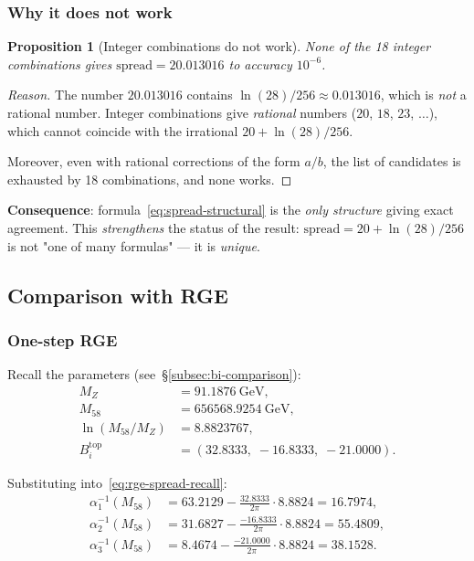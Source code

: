 \documentclass[11pt,a4paper]{article}
\newtheorem{proposition}[theorem]{Proposition}
\theoremstyle{definition}
\begin{document}
\subsubsection{Why it does not work}

\begin{proposition}[Integer combinations do not work]
\label{prop:integer-fails}
None of the 18 integer combinations gives
$\text{spread} = 20.013016$ to accuracy $10^{-6}$.
\end{proposition}

\begin{proof}[Reason]
The number $20.013016$ contains $\ln(28)/256 \approx 0.013016$,
which is \emph{not} a rational number. Integer
combinations give \emph{rational} numbers ($20$, $18$, $23$,
$\ldots$), which cannot coincide with the irrational
$20 + \ln(28)/256$.

Moreover, even with rational corrections of the form $a/b$,
the list of candidates is exhausted by 18 combinations, and none works.
\end{proof}

\medskip\noindent
\textbf{Consequence}: formula~\eqref{eq:spread-structural}
is the \emph{only structure} giving exact agreement.
This \emph{strengthens} the status of the result: $\text{spread} = 20 + \ln(28)/256$
is not "one of many formulas" --- it is \emph{unique}.

\subsection{Comparison with RGE}
\label{subsec:spread-rge}

\subsubsection{One-step RGE}

Recall the parameters (see~\S\ref{subsec:bi-comparison}):
\begin{align}
    M_Z &= 91.1876~\text{GeV}, \\
    M_{58} &= 656568.9254~\text{GeV}, \\
    \ln(M_{58}/M_Z) &= 8.8823767, \\
    B_i^{\text{top}} &= (32.8333,\; -16.8333,\; -21.0000).
\end{align}

\medskip\noindent
Substituting into~\eqref{eq:rge-spread-recall}:
\begin{align}
    \alpha_1^{-1}(M_{58}) &= 63.2129 - \frac{32.8333}{2\pi} \cdot 8.8824
    = 16.7974, \\
    \alpha_2^{-1}(M_{58}) &= 31.6827 - \frac{-16.8333}{2\pi} \cdot 8.8824
    = 55.4809, \\
    \alpha_3^{-1}(M_{58}) &= 8.4674 - \frac{-21.0000}{2\pi} \cdot 8.8824
    = 38.1528.
\end{align}
\end{document}
